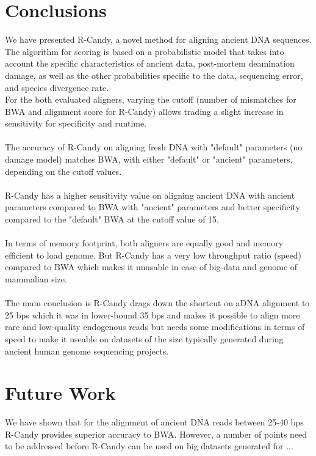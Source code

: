 \documentclass[11pt,a4paper]{report}
\begin{document}

\section{Conclusions} \label{Conclusions}


We have presented  R-Candy, a novel method for aligning ancient DNA sequences.
The algorithm for scoring is based on a probabilistic model that takes into account 
the specific characteristics of ancient data, post-mortem deamination damage, as 
well as the other probabilities specific to the data, sequencing error, and species
divergence rate. 
\\
For the both evaluated aligners, varying the cutoff (number of mismatches for BWA 
and alignment score for R-Candy) allows trading a slight increase in sensitivity 
for specificity and runtime.
\\\\
The accuracy of R-Candy on aligning fresh DNA with "default" parameters (no damage model) 
matches BWA, with either "default" or "ancient" parameters, depending  on the cutoff values.
\\\\
R-Candy has a higher sensitivity value on aligning ancient DNA with ancient parameters
compared to BWA with "ancient" parameters and better specificity compared to the 
"default" BWA at the cutoff value of 15.
\\\\
In terms of memory footprint, both aligners are equally good and memory efficient
to load genome. But R-Candy has a very low throughput ratio (speed) compared to 
BWA which makes it unusable in case of big-data and genome of mammalian size. 
\\\\
The main conclusion is R-Candy drags down the shortcut on aDNA alignment to 25 bps 
which it was in lower-bound 35 bps and makes it possible to align more rare and 
low-quality endogenous reads but needs some modifications in terms of speed to 
make it useable on datasets of the size typically generated during ancient human
genome sequencing projects. 



 

\section{Future Work} \label{Future Work}
We have shown that for the alignment of ancient DNA reads between 25-40 
bps R-Candy provides superior accuracy to BWA.  
However, a number of points need to be addressed before R-Candy can be used 
on big datasets generated for ... 
\end{document}
